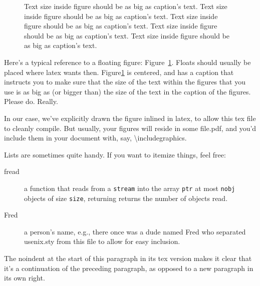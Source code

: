 \begin{figure}
\begin{center}
\end{center}
\caption{\label{fig:vectors} Text size inside figure should be as big as
  caption's text. Text size inside figure should be as big as
  caption's text. Text size inside figure should be as big as
  caption's text. Text size inside figure should be as big as
  caption's text. Text size inside figure should be as big as
  caption's text. }
\end{figure}


Here's a typical reference to a floating figure:
Figure~\ref{fig:vectors}. Floats should usually be placed where latex
wants then. Figure\ref{fig:vectors} is centered, and has a caption
that instructs you to make sure that the size of the text within the
figures that you use is as big as (or bigger than) the size of the
text in the caption of the figures. Please do. Really.

In our case, we've explicitly drawn the figure inlined in latex, to
allow this tex file to cleanly compile. But usually, your figures will
reside in some file.pdf, and you'd include them in your document
with, say, \textbackslash{}includegraphics.

Lists are sometimes quite handy. If you want to itemize things, feel
free:

\begin{description}
  
\item[fread] a function that reads from a \texttt{stream} into the
  array \texttt{ptr} at most \texttt{nobj} objects of size
  \texttt{size}, returning returns the number of objects read.

\item[Fred] a person's name, e.g., there once was a dude named Fred
  who separated usenix.sty from this file to allow for easy
  inclusion.
\end{description}

\noindent
The noindent at the start of this paragraph in its tex version makes
it clear that it's a continuation of the preceding paragraph, as
opposed to a new paragraph in its own right.


